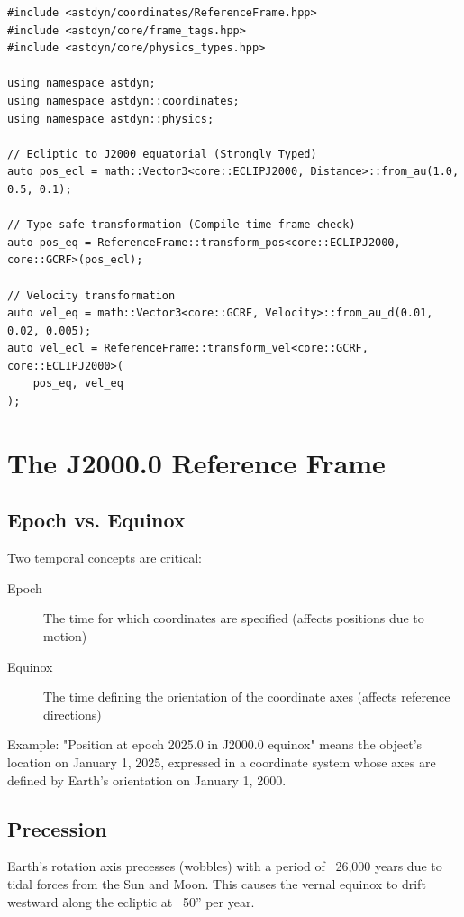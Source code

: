 \begin{lstlisting}[style=cpp,caption={Coordinate transformations in AstDyn}]
#include <astdyn/coordinates/ReferenceFrame.hpp>
#include <astdyn/core/frame_tags.hpp>
#include <astdyn/core/physics_types.hpp>

using namespace astdyn;
using namespace astdyn::coordinates;
using namespace astdyn::physics;

// Ecliptic to J2000 equatorial (Strongly Typed)
auto pos_ecl = math::Vector3<core::ECLIPJ2000, Distance>::from_au(1.0, 0.5, 0.1);

// Type-safe transformation (Compile-time frame check)
auto pos_eq = ReferenceFrame::transform_pos<core::ECLIPJ2000, core::GCRF>(pos_ecl);

// Velocity transformation
auto vel_eq = math::Vector3<core::GCRF, Velocity>::from_au_d(0.01, 0.02, 0.005);
auto vel_ecl = ReferenceFrame::transform_vel<core::GCRF, core::ECLIPJ2000>(
    pos_eq, vel_eq
);
\end{lstlisting}

\section{The J2000.0 Reference Frame}

\subsection{Epoch vs. Equinox}

Two temporal concepts are critical:

\begin{description}
    \item[Epoch] The time for which coordinates are specified (affects positions due to motion)
    \item[Equinox] The time defining the orientation of the coordinate axes (affects reference directions)
\end{description}

Example: "Position at epoch 2025.0 in J2000.0 equinox" means the object's location on January 1, 2025, expressed in a coordinate system whose axes are defined by Earth's orientation on January 1, 2000.

\subsection{Precession}

Earth's rotation axis precesses (wobbles) with a period of ~26,000 years due to tidal forces from the Sun and Moon. This causes the vernal equinox to drift westward along the ecliptic at ~50'' per year.

